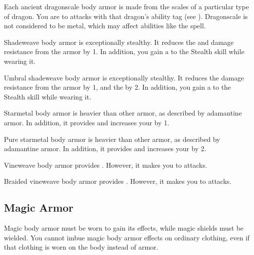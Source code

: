        Each ancient dragonscale body armor is made from the scales of a particular type of dragon.
      You are  to attacks with that dragon's ability tag (see ).
      Dragonscale is not considered to be metal, which may affect abilities like the  spell.

       Shadeweave body armor is exceptionally stealthy.
      It reduces the  and damage resistance from the armor by 1.
      In addition, you gain a   to the Stealth skill while wearing it.

       Umbral shadeweave body armor is exceptionally stealthy.
      It reduces the damage resistance from the armor by 1, and the  by 2.
      In addition, you gain a   to the Stealth skill while wearing it.

       Starmetal body armor is heavier than other armor, as described by adamantine armor.
      In addition, it provides   and increases your  by 1.

       Pure starmetal body armor is heavier than other armor, as described by adamantine armor.
      In addition, it provides   and increases your  by 2.

       Vineweave body armor provides  .
      However, it makes you \vulnerable to \atFire attacks.

       Braided vineweave body armor provides  .
      However, it makes you \vulnerable to \atFire attacks.

      \begin{longcolumn}
        \section{Magic Armor}\label{Magic Armor}
          \begin{longtablepreface}
            Magic body armor must be worn to gain its effects, while magic shields must be wielded.
            You cannot imbue magic body armor effects on ordinary clothing, even if that clothing is worn on the body instead of armor.
          \end{longtablepreface}

          

      \end{longcolumn}

